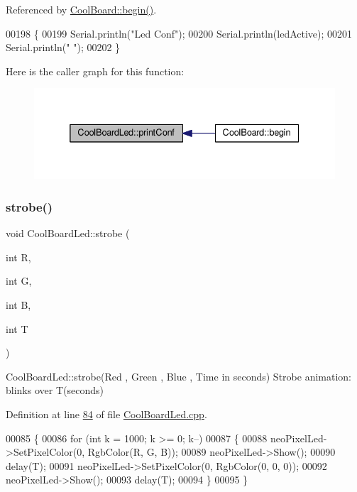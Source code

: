 Referenced by \hyperlink{_cool_board_8cpp_source_l00021}{Cool\+Board\+::begin()}.


\begin{DoxyCode}
00198 \{
00199     Serial.println(\textcolor{stringliteral}{"Led Conf"});
00200     Serial.println(ledActive);
00201     Serial.println(\textcolor{stringliteral}{" "});    
00202 \}
\end{DoxyCode}
Here is the caller graph for this function\+:\nopagebreak
\begin{figure}[H]
\begin{center}
\leavevmode
\includegraphics[width=332pt]{class_cool_board_led_a8ed3053a36f0ed4a131f43b5b17efb61_icgraph}
\end{center}
\end{figure}
\mbox{\label{class_cool_board_led_adc08c0ac07473499971c503d300f0413}} 
\subsubsection{\texorpdfstring{strobe()}{strobe()}}
{\footnotesize\ttfamily void Cool\+Board\+Led\+::strobe (\begin{DoxyParamCaption}\item[{int}]{R,  }\item[{int}]{G,  }\item[{int}]{B,  }\item[{int}]{T }\end{DoxyParamCaption})}

Cool\+Board\+Led\+::strobe(\+Red , Green , Blue , Time in seconds) Strobe animation\+: blinks over T(seconds) 

Definition at line \hyperlink{_cool_board_led_8cpp_source_l00084}{84} of file \hyperlink{_cool_board_led_8cpp_source}{Cool\+Board\+Led.\+cpp}.


\begin{DoxyCode}
00085 \{
00086     \textcolor{keywordflow}{for} (\textcolor{keywordtype}{int} k = 1000; k >= 0; k--) 
00087     \{
00088         neoPixelLed->SetPixelColor(0, RgbColor(R, G, B));
00089         neoPixelLed->Show();
00090         delay(T);
00091         neoPixelLed->SetPixelColor(0, RgbColor(0, 0, 0));
00092         neoPixelLed->Show();
00093         delay(T);
00094     \}
00095 \}
\end{DoxyCode}
\mbox{\label{class_cool_board_led_a30fadd4cbec17ceea428bf7a32207e87}} 

